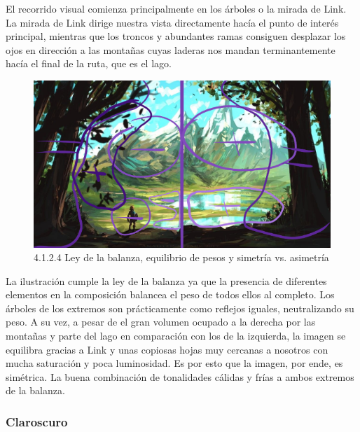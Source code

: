 \documentclass[12pt]{article}
\begin{document}
    El recorrido visual comienza principalmente en los árboles o la mirada de Link. La mirada de Link dirige nuestra vista directamente hacía el punto de interés principal, mientras que los troncos y abundantes ramas consiguen desplazar los ojos en dirección a las montañas cuyas laderas nos mandan terminantemente hacía el final de la ruta, que es el lago.

    \begin{figure}[H]
      \centering
      \includegraphics[scale=0.4]{images/Nerea/Nerea Zelda concept 124.PNG}
      \caption{\small 4.1.2.4 Ley de la balanza, equilibrio de pesos y simetría vs. asimetría}
    \end{figure}

    La ilustración cumple la ley de la balanza ya que la presencia de diferentes elementos en la composición balancea el peso de todos ellos al completo. Los árboles de los extremos son prácticamente como reflejos iguales, neutralizando su peso. A su vez, a pesar de el gran volumen ocupado a la derecha por las montañas y parte del lago en comparación con los de la izquierda, la imagen se equilibra gracias a Link y unas copiosas hojas muy cercanas a nosotros con mucha saturación y poca luminosidad. Es por esto que la imagen, por ende, es simétrica. La buena combinación de tonalidades cálidas y frías a ambos extremos de la balanza.


        \subsubsection{Claroscuro}
\end{document}

